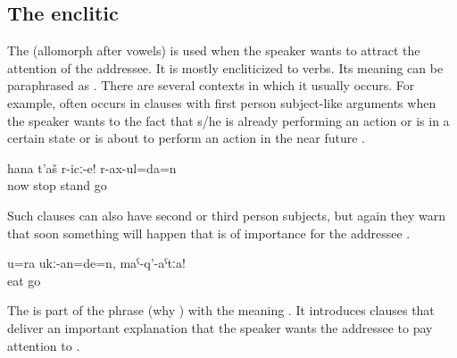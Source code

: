 
\subsection{The enclitic }
\label{ssec:The enclitic =n(u)}

The   (allomorph  after vowels) is used when the speaker wants to attract the attention of the addressee. It is mostly encliticized to verbs. Its meaning can be paraphrased as . There are several contexts in which it usually occurs. For example,  often occurs in clauses with first person subject-like arguments when the speaker wants to  the fact that s/he is already performing an action or is in a certain state or is about to perform an action in the near future .

\begin{exe}
	\ex	\label{ex:‎Now wait, I (fem.) am coming minor}
	\gll	hana	t'aš	r-icː-e!	r-ax-ul=da=n\\
		now	stop	stand	go\\
	\glt	{}
\end{exe}

Such clauses can also have second or third person subjects, but again they warn that soon something will happen that is of importance for the addressee .

\begin{exe}
	\ex	\label{ex:‎‎[Your sister turned into a monster, she ate people], and she will eat you (masc.), don't go minor}
	\gll	u=ra	ukː-an=de=n,	maˁ-q'-aˁtːa!\\
			eat	go\\
	\glt	{}
\end{exe}

The  is part of the phrase  (why ) with the meaning . It introduces clauses that deliver an important explanation that the speaker wants the addressee to pay attention to .

